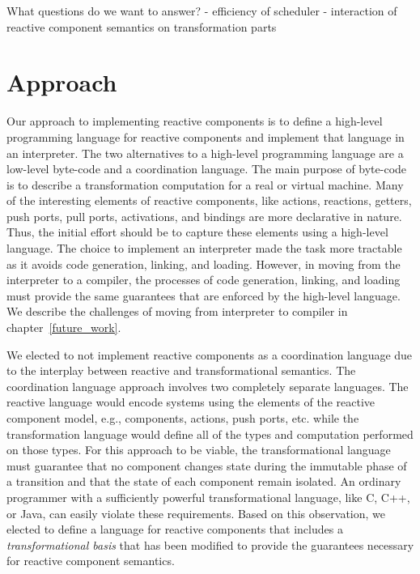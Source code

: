 What questions do we want to answer?
- efficiency of scheduler
- interaction of reactive component semantics on transformation parts



\section{Approach}
Our approach to implementing reactive components is to define a high-level programming language for reactive components and implement that language in an interpreter.
The two alternatives to a high-level programming language are a low-level byte-code and a coordination language.
The main purpose of byte-code is to describe a transformation computation for a real or virtual machine.
Many of the interesting elements of reactive components, like actions, reactions, getters, push ports, pull ports, activations, and bindings are more declarative in nature.
Thus, the initial effort should be to capture these elements using a high-level language.
The choice to implement an interpreter made the task more tractable as it avoids code generation, linking, and loading.
However, in moving from the interpreter to a compiler, the processes of code generation, linking, and loading must provide the same guarantees that are enforced by the high-level language.
We describe the challenges of moving from interpreter to compiler in chapter~\ref{future_work}.

We elected to not implement reactive components as a coordination language due to the interplay between reactive and transformational semantics.
The coordination language approach involves two completely separate languages.
The reactive language would encode systems using the elements of the reactive component model, e.g., components, actions, push ports, etc. while the transformation language would define all of the types and computation performed on those types.
For this approach to be viable, the transformational language must guarantee that no component changes state during the immutable phase of a transition and that the state of each component remain isolated.
An ordinary programmer with a sufficiently powerful transformational language, like C, C++, or Java, can easily violate these requirements.
Based on this observation, we elected to define a language for reactive components that includes a \emph{transformational basis} that has been modified to provide the guarantees necessary for reactive component semantics.

